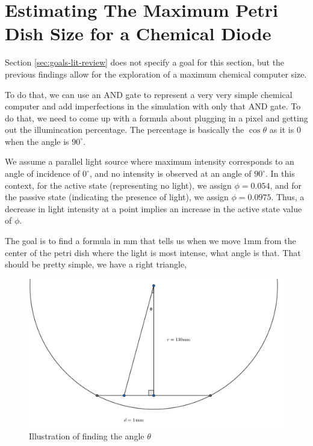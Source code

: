 \section{Estimating The Maximum Petri Dish Size for a Chemical Diode \citep{gorecki2003chemical}} \label{sec:computer-size-limitations}
Section \ref{sec:goals-lit-review} does not specify a goal for this section, but the previous findings allow for the exploration of a maximum chemical computer size. 

To do that, we can use an AND gate to represent a very very simple chemical computer and add imperfections in the simulation with only that AND gate. To do that, we need to come up with a formula about plugging in a pixel and getting out the illumincation percentage. 
The percentage is basically the $\cos\theta$ as it is 0 when the angle is $90^\circ$.
\begin{tcolorbox}[colback=red!5!white,colframe=blue!75!black,title=Assumption: Light Intensity and Angle Relationship]
We assume a parallel light source where maximum intensity corresponds to an angle of incidence of $0^\circ$, and no intensity is observed at an angle of $90^\circ$. In this context, for the active state (representing no light), we assign $\phi=0.054$, and for the passive state (indicating the presence of light), we assign $\phi=0.0975$. Thus, a decrease in light intensity at a point implies an increase in the active state value of $\phi$.
\end{tcolorbox}
The goal is to find a formula in mm that tells us when we move 1mm from the center of the petri dish where the light is most intense, what angle is that. That should be pretty simple, we have a right triangle, 
\begin{figure}
    \centering
    \includegraphics[width=1\linewidth]{geogebra-export (1).png}
    \caption{Illustration of finding the angle $\theta$}
    \label{fig:finding-theta}
\end{figure}

